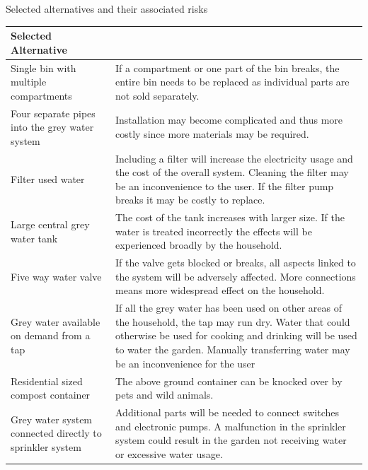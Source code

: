 \documentclass[a4paper,11pt,fleqn]{report}
\begin{document}
\begin{center}
\caption {Selected alternatives and their associated risks}
\begin{longtable}{p{7cm}|p{7cm}}\toprule
	{\textbf{Selected Alternative}} & {\textbf{Associated Risk}\\ \midrule
    \hline
    Single bin with multiple compartments & If a compartment or one part of the bin breaks, the entire bin needs to be replaced as individual parts are not sold separately.\\
        \hline
    Four separate pipes into the grey water system  & Installation may become complicated and thus more costly since more materials may be required.\\
        \hline
    Filter used water & Including a filter will increase the electricity usage and the cost of the overall system. Cleaning the filter may be an inconvenience to the user. If the filter pump breaks it may be costly to replace. \\
        \hline
   Large central grey water tank & The cost of the tank increases with larger size. If the water is treated incorrectly the effects will be experienced broadly by the household. \\
        \hline
    Five way water valve & If the valve gets blocked or breaks, all aspects linked to the system will be adversely affected. More connections means more widespread effect on the household.\\
        \hline
    Grey water available on demand from a tap & If all the grey water has been used on other areas of the household, the tap may run dry. Water that could otherwise be used for cooking and drinking will be used to water the garden. Manually transferring water may be an inconvenience for the user\\
        \hline
    Residential sized compost container & The above ground container can be knocked over by pets and wild animals.\\
        \hline
    Grey water system connected directly to sprinkler system & Additional parts will be needed to connect switches and electronic pumps. A malfunction in the sprinkler system could result in the garden not receiving water or excessive water usage. \\
    \bottomrule
\end{longtable}
\end{center}
%
\end{document}
